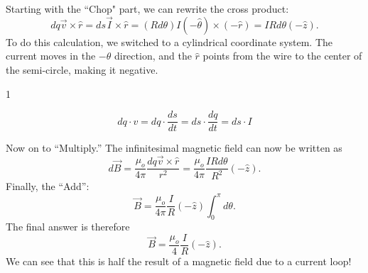 \documentclass[]{article}
\newcommand{\Tipsy}{0}
\renewcommand{\Tipsy}{1}
\newcommand{\TeachingTips}[1]{
\if\Tipsy1
\begin{tcolorbox}[colback=lightgray,colframe=black]
#1
\end{tcolorbox}
\fi
}
\begin{document}
Starting with the ``Chop" part, we can rewrite the cross product:
\[
	dq\vec{v}\times\hat{r} = ds\vec{I}\times\hat{r} = (Rd\theta)I(-\hat{\theta}) \times (-\hat{r}) = IRd\theta (-\hat{z}).
\]
To do this calculation, we switched to a cylindrical coordinate system. The current moves in the $-\hat{\theta}$ direction, and the $\hat{r}$ points from the wire to the center of the semi-circle, making it negative.

\TeachingTips{
\[
dq\cdot v = dq\cdot\frac{ds}{dt} = ds\cdot\frac{dq}{dt} = ds\cdot I 
\]
}

Now on to ``Multiply.'' The infinitesimal magnetic field can now be written as
\[
	d\vec{B} = \frac{\mu_o}{4\pi}\frac{dq\vec{v}\times\hat{r}}{r^2} = \frac{\mu_o}{4\pi}\frac{IRd\theta}{R^2} (-\hat{z}).
\]
Finally, the ``Add'':
\[
	\vec{B} = \frac{\mu_o}{4\pi}\frac{I}{R}(-\hat{z})\int_{0}^{\pi} d\theta.
\]
The final answer is therefore
\[
	\vec{B} = \frac{\mu_o}{4}\frac{I}{R}(-\hat{z}).
\]
We can see that this is half the result of a magnetic field due to a current loop!
\end{document}
